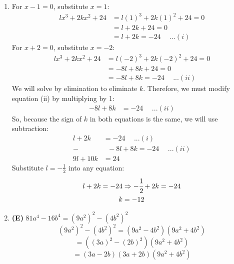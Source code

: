 \begin{multicols}{2}
\begin{enumerate}[label={\textbf{\arabic*.}}]
    
   \item For \( x - 1 = 0 \), substitute \( x = 1 \):
        \begin{align*}
            lx^3 + 2kx^2 + 24 &= l(1)^3 + 2k(1)^2 + 24 = 0 \\
            &= l + 2k + 24 = 0 \\ 
            &= l + 2k = -24 \hspace{15pt}...(i)
        \end{align*}
        For \( x + 2 = 0 \), substitute \( x = -2 \):
        \begin{align*}
            lx^3 + 2kx^2 + 24 &= l(-2)^3 + 2k(-2)^2 + 24 = 0 \\
            &= -8l + 8k + 24 = 0 \\ 
            &= -8l + 8k = -24 \hspace{15pt}...(ii)
        \end{align*}
        We will solve by elimination to eliminate \( k \). Therefore, we must modify equation (ii) by multiplying by 1:
        \begin{align*}
            -8l + 8k &= -24 \hspace{15pt}...(ii)
        \end{align*}
        So, because the sign of \( k \) in both equations is the same, we will use subtraction:
        \begin{align*} 
                l + 2k &= -24 \hspace{15pt}...(i) \\
            - &\hspace{7pt} -8l + 8k = -24 \hspace{15pt}...(ii) \\
            9l + 10k &= 24
        \end{align*}
        Substitute \( l = -\frac{1}{2} \) into any equation:
        \begin{align*}
            l + 2k = -24 &\Rightarrow -\cfrac{1}{2} + 2k = -24 \\
            k &= -12
        \end{align*}

    \item \textbf{(E)} \( 81a^4 - 16b^4 = \left(9a^2\right)^2 - \left(4b^2\right)^2 \)
        \[\left(9a^2\right)^2 - \left(4b^2\right)^2 = (9a^2 - 4b^2)(9a^2 + 4b^2)\]
        \[ = \left((3a)^2 - (2b)^2\right)(9a^2 + 4b^2)\]
        \[= (3a - 2b)(3a + 2b)(9a^2 + 4b^2)\] 


\end{enumerate}
\end{multicols}
